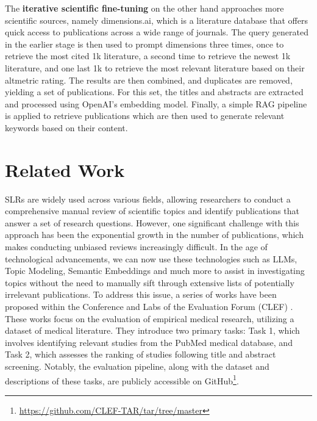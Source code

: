 The \textbf{iterative scientific fine-tuning} on the other hand approaches more scientific sources, namely dimensions.ai, which is a literature database that offers quick access to publications across a wide range of journals. The query generated in the earlier stage is then used to prompt dimensions three times, once to retrieve the most cited 1k literature, a second time to retrieve the newest 1k literature, and one last 1k to retrieve the most relevant literature based on their altmetric rating. The results are then combined, and duplicates are removed, yielding a set of publications. For this set, the titles and abstracts are extracted and processed using OpenAI's embedding model. Finally, a simple RAG pipeline is applied to retrieve publications which are then used to generate relevant keywords based on their content.

\section{Related Work}\label{sec:relwork}

SLRs are widely used across various fields, allowing researchers to conduct a comprehensive manual review of scientific topics and identify publications that answer a set of research questions. However, one significant challenge with this approach has been the exponential growth in the number of publications, which makes conducting unbiased reviews increasingly difficult. In the age of technological advancements, we can now use these technologies such as LLMs, Topic Modeling, Semantic Embeddings and much more to assist in investigating topics without the need to manually sift through extensive lists of potentially irrelevant publications. To address this issue, a series of works have been proposed within the Conference and Labs of the Evaluation Forum (CLEF) \autocite{kanoulas2017clef, kanoulas2018clef, kanoulas2019clef}. These works focus on the evaluation of empirical medical research, utilizing a dataset of medical literature. They introduce two primary tasks: Task 1, which involves identifying relevant studies from the PubMed medical database, and Task 2, which assesses the ranking of studies following title and abstract screening. Notably, the evaluation pipeline, along with the dataset and descriptions of these tasks, are publicly accessible on GitHub\footnote{\url{https://github.com/CLEF-TAR/tar/tree/master}}.

